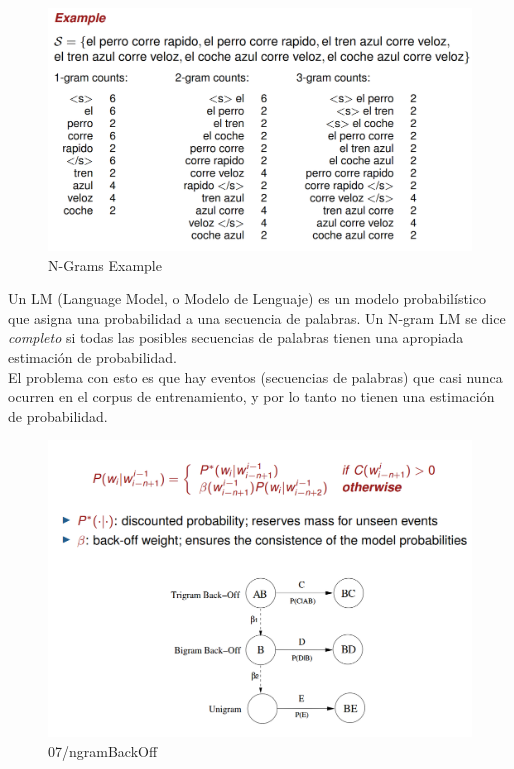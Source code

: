 \begin{figure}[htbp]
   \centering
   \includegraphics{images/07/ngramExample.png}
   \caption{N-Grams Example}
   \label{fig:07/ngramExample}
\end{figure}

Un LM (Language Model, o Modelo de Lenguaje) es un modelo probabilístico que asigna una probabilidad a una secuencia de palabras.
Un N-gram LM se dice \textit{completo} si todas las posibles secuencias de palabras tienen una apropiada estimación de probabilidad.\\
El problema con esto es que hay eventos (secuencias de palabras) que casi nunca ocurren en el corpus de entrenamiento, y por lo tanto no tienen una estimación de probabilidad.

\begin{figure}[htbp]
   \centering
   \includegraphics{images/07/ngramBackOff.png}
   \caption{07/ngramBackOff}
   \label{fig:07/ngramBackOff}
\end{figure}


